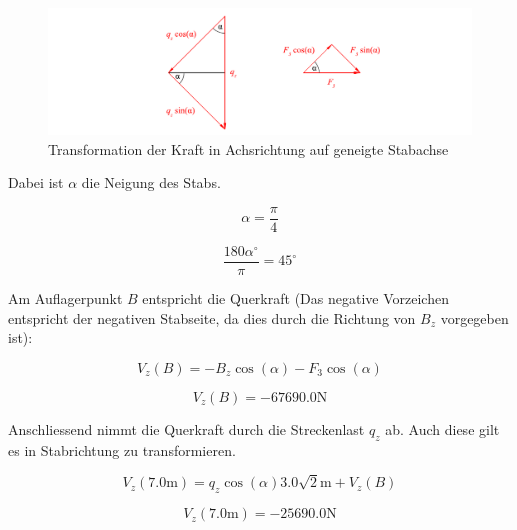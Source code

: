 \documentclass[
  12pt,
  letterpaper,
  DIV=11,
  egregdoesnotlikesansseriftitles]{scrartcl}
\begin{document}
\begin{figure}[H]

{\centering \includegraphics{BSI_HS23_Testat_02_files/mediabag/../images/Testat_02_HS23_Winkel.pdf}

}

\caption{\label{fig-winkel}Transformation der Kraft in Achsrichtung auf
geneigte Stabachse}

\end{figure}

Dabei ist \(\alpha\) die Neigung des Stabs.

\begin{equation}\alpha = \frac{\pi}{4}\end{equation}

\begin{equation}\frac{180 \alpha ^\circ}{\pi} = 45 ^\circ\end{equation}

Am Auflagerpunkt \(B\) entspricht die Querkraft (Das negative Vorzeichen
entspricht der negativen Stabseite, da dies durch die Richtung von
\(B_z\) vorgegeben ist):

\begin{equation}V_{z}{\left(B \right)} = - B_{z} \cos{\left(\alpha \right)} - F_{3} \cos{\left(\alpha \right)}\end{equation}

\begin{equation}V_{z}{\left(B \right)} = - 67690.0 \text{N}\end{equation}

Anschliessend nimmt die Querkraft durch die Streckenlast \(q_z\) ab.
Auch diese gilt es in Stabrichtung zu transformieren.

\begin{equation}V_{z}{\left(7.0 \text{m} \right)} = q_{z} \cos{\left(\alpha \right)} 3.0 \sqrt{2} \text{m} + V_{z}{\left(B \right)}\end{equation}

\begin{equation}V_{z}{\left(7.0 \text{m} \right)} = - 25690.0 \text{N}\end{equation}
\end{document}
